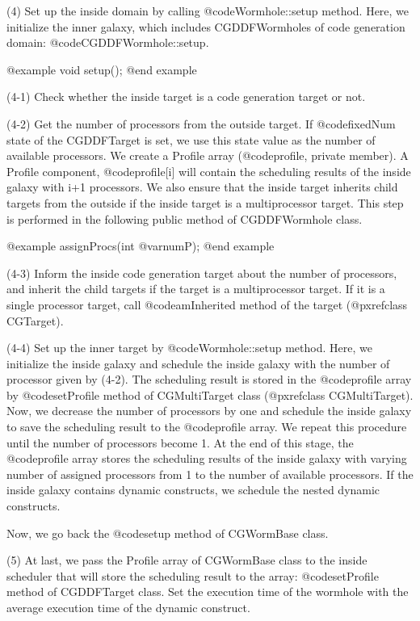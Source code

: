 {(4) Set up the inside domain by calling @code{Wormhole::setup} method.
Here, we initialize the inner galaxy, which includes CGDDFWormholes of
code generation domain: @code{CGDDFWormhole::setup}.

@example
void setup();
@end example
 
(4-1) Check whether the inside target is a code generation target or not.

(4-2) Get the number of processors from the outside target. If @code{fixedNum}
state of the CGDDFTarget is set, we use this state value as the number of
available processors. We create a Profile array (@code{profile}, private
member). A Profile component, @code{profile[i]} will contain the scheduling
results of the inside galaxy with i+1 processors. We also ensure that
the inside target inherits child targets from the outside if the inside
target is a multiprocessor target. This step is performed in
the following public method of CGDDFWormhole class.

@example
assignProcs(int @var{numP});
@end example

(4-3) Inform the inside code generation target about the number of
processors, and inherit the child targets if the target is a multiprocessor
target. If it is a single processor target, call @code{amInherited} method
of the target (@pxref{class CGTarget}).

(4-4) Set up the inner target by @code{Wormhole::setup} method. Here, we
initialize the inside galaxy and schedule the inside galaxy with
the number of processor given by (4-2). The scheduling result is stored
in the @code{profile} array by @code{setProfile} method of CGMultiTarget
class (@pxref{class CGMultiTarget}). Now, we decrease the number of
processors by one and schedule the inside galaxy to save the scheduling
result to the @code{profile} array. We repeat this procedure until the number
of processors become 1. At the end of this stage, the @code{profile}
array stores the scheduling results of the inside galaxy with
varying number of assigned processors from 1 to the number of available
processors. If the inside galaxy contains dynamic
constructs, we schedule the nested dynamic constructs.

Now, we go back the @code{setup} method of CGWormBase class.

(5) At last, we pass the Profile array of CGWormBase class to the
inside scheduler that will store the scheduling result to the array:
@code{setProfile} method of CGDDFTarget class.
Set the execution time of the wormhole with the average execution time of
the dynamic construct.
 
}
